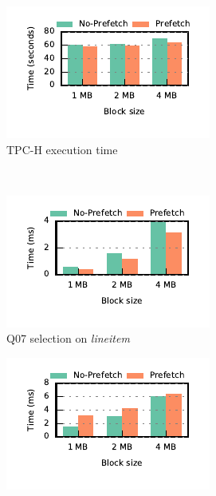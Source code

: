 \begin{figure}[t]
	\centering 
	\begin{subfigure}[ht]{0.225\textwidth}
		\includegraphics[width=\textwidth]{pipeline/figures/prefetching-total-execution-time-withlip-rowstore}
		\caption{TPC-H execution time}
		\label{fig:prefetching-total}
	\end{subfigure}
	~
	\begin{subfigure}[ht]{0.225\textwidth}
		\includegraphics[width=\textwidth]{pipeline/figures/prefetching-q07-select-withlip-rowstore}
		\caption{Q07 selection on \textit{lineitem}}
		\label{fig:prefetching-select-q07}
		\end{subfigure}
	\begin{subfigure}[ht]{0.225\textwidth}
		\includegraphics[width=\textwidth]{pipeline/figures/prefetching-q07-build-withlip-rowstore}

\end{subfigure}
\end{figure}
